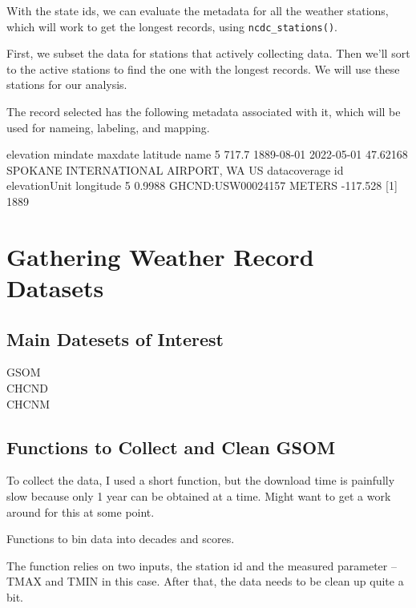 \documentclass{article}
\begin{document}
With the state ids, we can evaluate the metadata for all the weather stations, which will work to get the longest records, using \texttt{ncdc\_stations()}. 

First, we subset the data for stations that actively collecting data. Then we'll sort to the active stations to find the one with the longest records. We will use these stations for our analysis.



The record selected has the following metadata associated with it, which will be used for nameing, labeling, and mapping. 

  elevation    mindate    maxdate latitude                                 name
5     717.7 1889-08-01 2022-05-01 47.62168 SPOKANE INTERNATIONAL AIRPORT, WA US
  datacoverage                id elevationUnit longitude
5       0.9988 GHCND:USW00024157        METERS  -117.528
[1] 1889


\section{Gathering Weather Record Datasets}

\subsection{Main Datesets of Interest}

\begin{description}
  \item[GSOM]
  \item[CHCND]
  \item[CHCNM]
\end{description}

\subsection{Functions to Collect and Clean GSOM}

To collect the data, I used a short function, but the download time is painfully slow because only 1 year can be obtained at a time. Might want to get a work around for this at some point. 



Functions to bin data into decades and scores. 



The function relies on two inputs, the station id and the measured parameter -- TMAX and TMIN in this case. After that, the data needs to be clean up quite a bit. 
\end{document}
